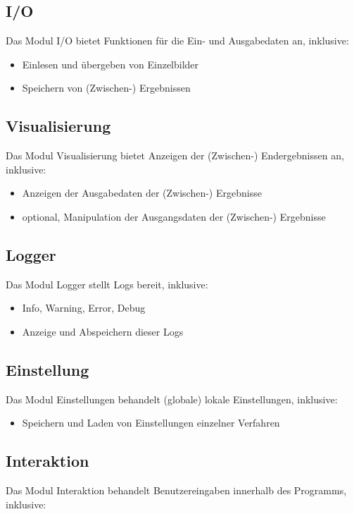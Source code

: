 \subsection{I/O}

Das Modul I/O bietet Funktionen für die Ein- und Ausgabedaten an, inklusive:

\begin{itemize}
\item Einlesen und übergeben von Einzelbilder
\item Speichern von (Zwischen-) Ergebnissen
\end{itemize}

\subsection{Visualisierung}
Das Modul Visualisierung bietet Anzeigen der (Zwischen-) Endergebnissen  an, inklusive:

\begin{itemize}
\item Anzeigen der Ausgabedaten der (Zwischen-) Ergebnisse
\item optional, Manipulation der Ausgangsdaten der (Zwischen-) Ergebnisse
\end{itemize}

\subsection{Logger}
Das Modul Logger stellt Logs bereit, inklusive:

\begin{itemize}
\item Info, Warning, Error, Debug
\item Anzeige und Abspeichern dieser Logs
\end{itemize}

\subsection{Einstellung}
Das Modul Einstellungen behandelt (globale) lokale Einstellungen, inklusive:

\begin{itemize}
\item Speichern und Laden von Einstellungen einzelner Verfahren
\end{itemize}

\subsection{Interaktion}
Das Modul Interaktion behandelt Benutzereingaben innerhalb des Programms, inklusive:

